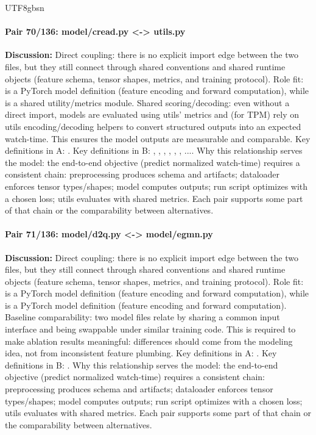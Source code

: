 \documentclass[11pt]{article}
\begin{document}
\begin{CJK*}{UTF8}{gbsn}
\paragraph{Pair 70/136: model/cread.py <-> utils.py}
\textbf{Discussion:} Direct coupling: there is no explicit import edge between the two files, but they still connect through shared conventions and shared runtime objects (feature schema, tensor shapes, metrics, and training protocol). Role fit: \texttt{} is a PyTorch model definition (feature encoding and forward computation), while \texttt{} is a shared utility/metrics module. Shared scoring/decoding: even without a direct import, models are evaluated using utils' metrics and (for TPM) rely on utils encoding/decoding helpers to convert structured outputs into an expected watch-time. This ensures the model outputs are measurable and comparable. Key definitions in A: \texttt{}. Key definitions in B: \texttt{}, \texttt{}, \texttt{}, \texttt{}, \texttt{}, \texttt{}, .... Why this relationship serves the model: the end-to-end objective (predict normalized watch-time) requires a consistent chain: preprocessing produces schema and artifacts; dataloader enforces tensor types/shapes; model computes outputs; run script optimizes with a chosen loss; utils evaluates with shared metrics. Each pair supports some part of that chain or the comparability between alternatives.

\paragraph{Pair 71/136: model/d2q.py <-> model/egmn.py}
\textbf{Discussion:} Direct coupling: there is no explicit import edge between the two files, but they still connect through shared conventions and shared runtime objects (feature schema, tensor shapes, metrics, and training protocol). Role fit: \texttt{} is a PyTorch model definition (feature encoding and forward computation), while \texttt{} is a PyTorch model definition (feature encoding and forward computation). Baseline comparability: two model files relate by sharing a common input interface and being swappable under similar training code. This is required to make ablation results meaningful: differences should come from the modeling idea, not from inconsistent feature plumbing. Key definitions in A: \texttt{}. Key definitions in B: \texttt{}. Why this relationship serves the model: the end-to-end objective (predict normalized watch-time) requires a consistent chain: preprocessing produces schema and artifacts; dataloader enforces tensor types/shapes; model computes outputs; run script optimizes with a chosen loss; utils evaluates with shared metrics. Each pair supports some part of that chain or the comparability between alternatives.


\end{CJK*}
\end{document}
